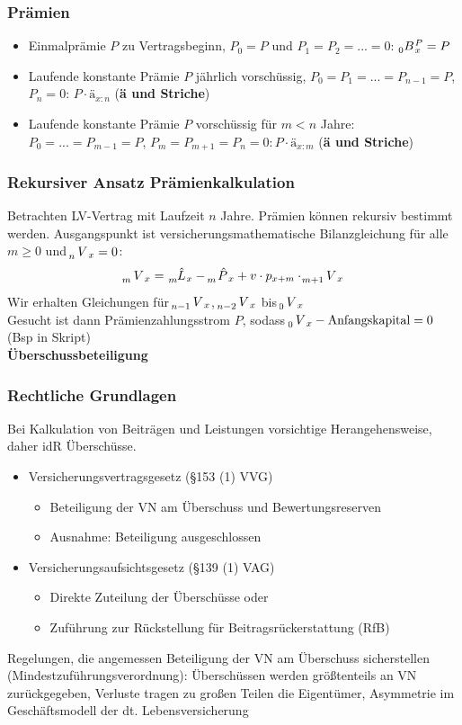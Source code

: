 \documentclass[12pt]{report}
\theoremstyle{dotless}
\theoremstyle{definition}
\begin{document}
\subsubsection{Prämien}
\begin{itemize}
\item Einmalprämie $P$ zu Vertragsbeginn, $P_0=P$ und $P_1=P_2=...=0$: $\tensor[_0]{B}{}_x^P = P$
\item Laufende konstante Prämie $P$ jährlich vorschüssig, $P_0=P_1=...=P_{n-1}=P$, $P_n=0$: $P\cdot ä_{x:n}$ (\textbf{ä und Striche})
\item Laufende konstante Prämie $P$ vorschüssig für $m<n$ Jahre: $P_0=...=P_{m-1}=P$, $P_m=P_{m+1}=P_n=0: P\cdot ä_{x:m}$ (\textbf{ä und Striche})
\end{itemize}

\subsubsection{Rekursiver Ansatz Prämienkalkulation}
Betrachten LV-Vertrag mit Laufzeit $n$ Jahre. Prämien können rekursiv bestimmt werden. Ausgangspunkt ist versicherungsmathematische Bilanzgleichung für alle $m\geq 0$ und $\tensor[_n]{V}{}_x=0$:
\begin{equation}
\tensor[_m]{V}{}_x = \tensor[_m]{\hat{L}}{}_x - \tensor[_m]{\hat{P}}{}_x + v \cdot p_{x+m} \cdot \tensor[_{m+1}]{V}{}_x
\end{equation}
Wir erhalten Gleichungen für $\tensor[_{n-1}]{V}{}_x$, $\tensor[_{n-2}]{V}{}_x$ bis $ \tensor[_0]{V}{}_x$ \\
Gesucht ist dann Prämienzahlungsstrom $P$, sodass $\tensor[_0]{V}{}_x - \text{Anfangskapital} =0$ (Bsp in Skript)\\

\large \textbf{Überschussbeteiligung}
\normalsize 
\subsubsection{Rechtliche Grundlagen}
Bei Kalkulation von Beiträgen und Leistungen vorsichtige Herangehensweise, daher idR Überschüsse.
\begin{itemize}
\item Versicherungsvertragsgesetz (§153 (1) VVG)
\begin{itemize}
\item Beteiligung der VN am Überschuss und Bewertungsreserven
\item Ausnahme: Beteiligung ausgeschlossen
\end{itemize}
\item Versicherungsaufsichtsgesetz (§139 (1) VAG)
\begin{itemize}
\item Direkte Zuteilung der Überschüsse oder
\item Zuführung zur Rückstellung für Beitragsrückerstattung (RfB)
\end{itemize}
\end{itemize}
Regelungen, die angemessen Beteiligung der VN am Überschuss sicherstellen (Mindestzuführungsverordnung): Überschüssen werden größtenteils an VN zurückgegeben, Verluste tragen zu großen Teilen die Eigentümer, Asymmetrie im Geschäftsmodell der dt. Lebensversicherung
\end{document}
